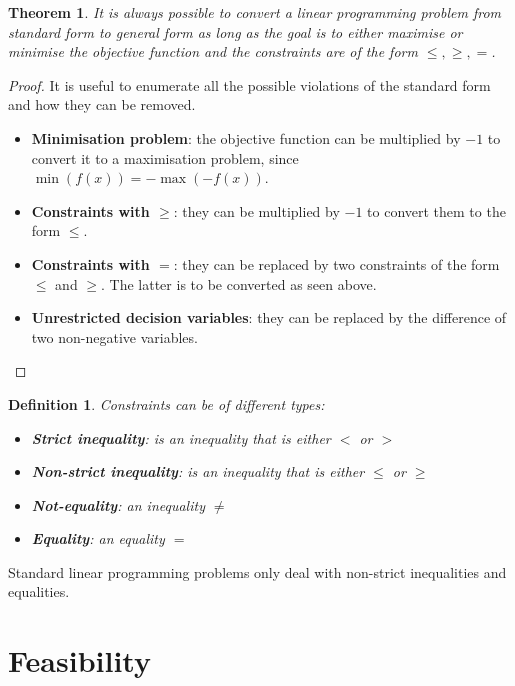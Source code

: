 \documentclass[preview,border=12pt,varwidth]{report}
\newtheorem{theorem}{Theorem}
\newtheorem{definition}{Definition}
\begin{document}
\begin{theorem}
    It is always possible to convert a linear programming problem from standard form to general form as long as the goal is to either maximise or minimise the objective function and the constraints are of the form $\le, \ge, =$.
\end{theorem}
\begin{proof}
    It is useful to enumerate all the possible violations of the standard form and how they can be removed.
    \begin{itemize}
        \item \textbf{Minimisation problem}: the objective function can be multiplied by $-1$ to convert it to a maximisation problem, since $\min(f(x)) = -\max(-f(x))$.
        \item \textbf{Constraints with $\geq$}: they can be multiplied by $-1$ to convert them to the form $\leq$.
        \item \textbf{Constraints with $=$}: they can be replaced by two constraints of the form $\leq$ and $\geq$.
              The latter is to be converted as seen above.
        \item \textbf{Unrestricted decision variables}: they can be replaced by the difference of two non-negative variables.
    \end{itemize}
\end{proof}

\begin{definition}
    Constraints can be of different types:

    \begin{itemize}
        \item \textbf{Strict inequality}: is an inequality that is either $<$ or $>$
        \item \textbf{Non-strict inequality}: is an inequality that is either $\leq$ or $\geq$
        \item \textbf{Not-equality}: an inequality $\neq$
        \item \textbf{Equality}: an equality $=$
    \end{itemize}
\end{definition}

Standard linear programming problems only deal with non-strict inequalities and equalities.

\section*{Feasibility}
\end{document}
